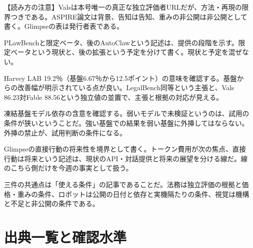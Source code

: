 \documentclass[lualatex,a4paper,10pt]{jlreq}
\begin{document}
\begin{tcolorbox}[colback=SurveySoft,colframe=SurveyRule,arc=1mm,boxrule=0.4pt,left=2mm,right=2mm]
【読み方の注意】Valsは本号唯一の真正な独立評価者URLだが、方法・再現の限界つきである。ASPIRE論文は背景、告知は告知、重みの非公開は非公開として書く。Glimpseの表は発行者表である。
\end{tcolorbox}
\cite{B55,B53,B54,B57,B56,B58,B59,B88}

PLawBenchと限定ベータ、後のAutoClawという記述は、提供の段階を示す。限定ベータという現状と、後の拡張という予定を分けて書く。現状と予定を混ぜない。
\cite{B55,B53,B54}


Harvey LAB 19.2％（基盤6.67％から12.5ポイント）の意味を確認する。基盤からの改善幅が明示されている点が良い。LegalBench同等という主張と、Vals 86.23対Fable 88.56という独立値の並置で、主張と根拠の対応が見える。
\cite{B55,B53,B54}


凍結基盤モデル依存の含意を確認する。弱いモデルで未検証というのは、試用の条件が狭いということだ。強い基盤での結果を弱い基盤に外挿してはならない。外挿の禁止が、試用判断の条件になる。
\cite{B57,B56}


Glimpseの直接行動の将来性を境界として書く。トークン費用が次の焦点、直接行動は将来という記述は、現状のAPI・対話提供と将来の展望を分ける線だ。線のこちら側だけを今週の事実として扱う。
\cite{B58,B59,B88}


三件の共通点は「使える条件」の記事であることだ。法務は独立評価の根拠と価格・重みの条件、ロボットは公開の日付と依存と実機隔たりの条件、視覚は機構と不足と非公開の条件である。
\cite{B55,B53,B54,B57,B56,B58,B59,B88}


\clearpage  %
\section*{出典一覧と確認水準}
\end{document}

